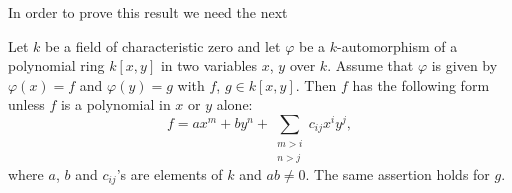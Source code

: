 \subsubsection{}\label{chap1:6.7.1}
In order to prove this result we need the next

\begin{lemma*}
Let $k$ be a field of characteristic zero and let $\varphi$ be a
$k$-automor\-phism of a polynomial ring $k[x,y]$ in two variables $x$,
$y$ over $k$. Assume that $\varphi$ is given by $\varphi(x)=f$ and
$\varphi(y)=g$ with $f$, $g\in k[x,y]$. Then $f$ has the following
form unless $f$ is a polynomial in $x$ or $y$ alone:
\begin{equation*}
f=ax^{m}+by^{n}+\sum_{\substack{m>i\\ n>j}}c_{ij}x^{i}y^{j},\tag{*}
\end{equation*}
where $a$, $b$ and $c_{ij}$'s are elements of $k$ and $ab\neq 0$. The
same assertion holds for $g$.
\end{lemma*}

